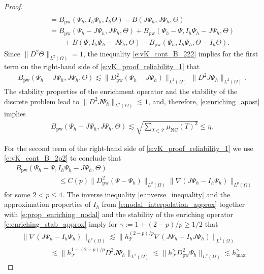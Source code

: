 \documentclass[a4paper]{amsart}
\theoremstyle{definition}
\numberwithin{equation}{section}
\numberwithin{theorem}{section}
\newcommand{\pw}{\mathrm{pw}}
\newcommand{\nc}{\mathrm{NC}}
\newcommand{\tri}{\mathcal{T}}
\begin{document}
\begin{proof}
\begin{equation}
\begin{aligned}
           \\
        &\qquad  
        =  B_\pw(\Psi_h,I_h\Psi_h,I_h\Theta)
          - B(J\Psi_h,J\Psi_h,\Theta)\\
        &\qquad  
        = B_\pw(\Psi_h-J\Psi_h,J\Psi_h,\Theta) 
          + B_\pw(\Psi_h-\Psi,I_h\Psi_h-J\Psi_h,\Theta)\\
        &\qquad \qquad 
          + B(\Psi,I_h\Psi_h-J\Psi_h,\Theta)
          - B_\pw(\Psi_h,I_h\Psi_h,\Theta-I_h\Theta).
    \end{aligned}
    \end{equation}
    Since $\lVert D^2\Theta\rVert_{L^2(\Omega)}=1$, 
    the inequality \eqref{e:vK_cont_B_222} implies for 
    the first term on the right-hand side
    of \eqref{e:vK_proof_reliability_1} that 
    \begin{align*}
        B_\pw(\Psi_h-J\Psi_h,J\Psi_h,\Theta)
        \lesssim \lVert D^2_\pw(\Psi_h-J\Psi_h)\rVert_{L^2(\Omega)}
              \,\lVert D^2 J\Psi_h\rVert_{L^2(\Omega)}.
    \end{align*}
    The stability properties of the enrichment operator and the 
    stability of the discrete problem lead to
    $\lVert D^2 J\Psi_h\rVert_{L^2(\Omega)}\lesssim 1$, and, therefore,
    \eqref{e:enriching_apost} implies
    \begin{align*}
        B_\pw(\Psi_h-J\Psi_h,J\Psi_h,\Theta) 
        \lesssim \sqrt{\sum_{T\in\tri}\mu_\nc(T)^2}
        \leq\eta
        .
    \end{align*}
    
    
    For the second term of the right-hand side of 
    \eqref{e:vK_proof_reliability_1} we use \eqref{e:vK_cont_B_2p2}
    to conclude that
    \begin{align*}
        &B_\pw(\Psi_h-\Psi,I_h\Psi_h-J\Psi_h,\Theta)\\
        &\qquad \qquad\qquad
        \leq C(p) \lVert D_\pw^2 (\Psi-\Psi_h)\rVert_{L^2(\Omega)}
           \lVert \nabla (J\Psi_h-I_h\Psi_h)\rVert_{L^p(\Omega)}
    \end{align*}
    for some $2<p\leq 4$.
    The inverse inequality \eqref{e:inverse_inequality} 
    and the approximation properties of $I_h$ from 
    \eqref{e:nodal_interpolation_approx} together with
    \eqref{e:prop_enriching_nodal} and the stability of the 
    enriching operator \eqref{e:enriching_stab_approx} imply
    for $\gamma:={1+(2-p)/p}\geq 1/2$ that
    \begin{align*}
        &\lVert \nabla (J\Psi_h-I_h\Psi_h)\rVert_{L^p(\Omega)}
        \lesssim
            \lVert h_\tri^{(2-p)/p}\nabla (J\Psi_h-I_hJ\Psi_h)\rVert_{L^2(\Omega)}\\
        &\qquad\qquad
        \lesssim
            \lVert h_\tri^{1+(2-p)/p}D^2 J\Psi_h \rVert_{L^2(\Omega)}
        \lesssim \lVert h_\tri^\gamma D^2_\pw \Psi_h \rVert_{L^2(\Omega)}
        \lesssim h_{\max}^\gamma
        .
    \end{align*}
    

\end{proof}
\end{document}
